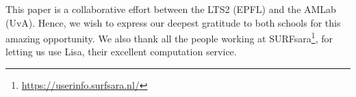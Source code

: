 \documentclass{article}
\begin{document}

\begin{ack}
This paper is a collaborative effort between the LTS2 (EPFL) and the AMLab (UvA). Hence, we wish to express our deepest gratitude to both schools for this amazing opportunity. We also thank all the people working at SURFsara\footnote{\url{https://userinfo.surfsara.nl/}}, for letting us use Lisa, their excellent computation service.
\end{ack}

\clearpage


\end{document}
